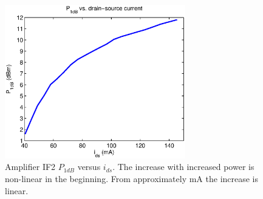 				\begin{figure}[h!]
					\centering
					\includegraphics[width=0.7\textwidth]{fig/amplifiers/if2/p1dbvscurrent}
					\caption[Amplifier IF2 $P_{1dB}$ versus $i_{ds}$.]{Amplifier IF2 $P_{1dB}$ versus $i_{ds}$. The increase with increased power is non-linear in the beginning. From approximately \unit[90]{mA} the increase is linear.}\label{fig:if2p1dbvspower}
				\end{figure}

